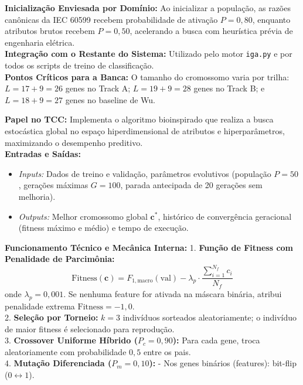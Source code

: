 \documentclass[10pt,a4paper]{article}
\begin{document}
\begin{filebox}
\begin{enumerate}[leftmargin=*,itemsep=0pt]
\end{enumerate}
\textbf{Inicialização Enviesada por Domínio:} Ao inicializar a população, as razões canônicas da IEC 60599 recebem probabilidade de ativação $P=0,80$, enquanto atributos brutos recebem $P=0,50$, acelerando a busca com heurística prévia de engenharia elétrica.\\
\textbf{Integração com o Restante do Sistema:} Utilizado pelo motor \texttt{iga.py} e por todos os scripts de treino de classificação.\\
\textbf{Pontos Críticos para a Banca:} O tamanho do cromossomo varia por trilha: $L = 17 + 9 = 26$ genes no Track A; $L = 19 + 9 = 28$ genes no Track B; e $L = 18 + 9 = 27$ genes no baseline de Wu.
\end{filebox}

\begin{filebox}
\textbf{Papel no TCC:} Implementa o algoritmo bioinspirado que realiza a busca estocástica global no espaço hiperdimensional de atributos e hiperparâmetros, maximizando o desempenho preditivo.\\
\textbf{Entradas e Saídas:}
\begin{itemize}[leftmargin=*,itemsep=1pt]
  \item \textit{Inputs:} Dados de treino e validação, parâmetros evolutivos (população $P=50$, gerações máximas $G=100$, parada antecipada de 20 gerações sem melhoria).
  \item \textit{Outputs:} Melhor cromossomo global $\mathbf{c}^*$, histórico de convergência geracional (fitness máximo e médio) e tempo de execução.
\end{itemize}
\textbf{Funcionamento Técnico e Mecânica Interna:} 
1. \textbf{Função de Fitness com Penalidade de Parcimônia:}
   $$\text{Fitness}(\mathbf{c}) = F_{1,\text{macro}}(\text{val}) - \lambda_p \cdot \frac{\sum_{i=1}^{N_f} c_i}{N_f}$$
   onde $\lambda_p = 0,001$. Se nenhuma feature for ativada na máscara binária, atribui penalidade extrema $\text{Fitness} = -1,0$.\\
2. \textbf{Seleção por Torneio:} $k=3$ indivíduos sorteados aleatoriamente; o indivíduo de maior fitness é selecionado para reprodução.\\
3. \textbf{Crossover Uniforme Híbrido ($P_c = 0,90$):} Para cada gene, troca aleatoriamente com probabilidade $0,5$ entre os pais.\\
4. \textbf{Mutação Diferenciada ($P_m = 0,10$):}
   - Nos genes binários (features): bit-flip ($0 \leftrightarrow 1$).

\end{filebox}
\end{document}
